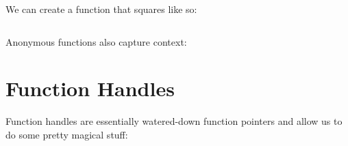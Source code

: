 \documentclass{article}
\begin{document}
We can create a function that squares like so:

\inputminted{matlab}{04-functions.d/sq.m}

Anonymous functions also capture context:


\section{Function Handles}

Function handles are essentially watered-down function pointers and
allow us to do some pretty magical stuff:

\end{document}
